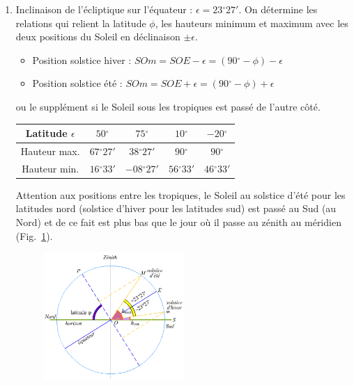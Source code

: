\documentclass[a4paper,10pt]{report}
\renewcommand{\deg}{\ensuremath{^{\circ}}}
\begin{document}
\begin{Answer}
  \begin{enumerate}
  \item Inclinaison de l'écliptique sur l'équateur :
    $\epsilon=23\deg27'$. On détermine les relations qui relient la
    latitude $\phi$, les hauteurs minimum et maximum avec les deux
    positions du Soleil en déclinaison $\pm \epsilon$.
    \begin{itemize}
    \item Position solstice hiver : $SOm = SOE - \epsilon =
      (90\deg-\phi) -\epsilon$
    \item Position solstice été : $SOm = SOE + \epsilon =
      (90\deg-\phi) +\epsilon$
    \end{itemize}
    ou le supplément si le Soleil sous les tropiques est passé de
    l'autre côté.
    \begin{center}
      \begin{tabular}{|c|c|c|c|c|}
        \hline
        Latitude $\epsilon$ & $50\deg$ & $75\deg$ & $10\deg$ &
        $-20\deg$ \\
        \hline
        Hauteur max. & $67\deg27'$ & $38\deg27'$ & $90\deg$ &
        $90\deg$ \\
        \hline
        Hauteur min. & $16\deg33'$ & $-08\deg27'$ & $56\deg33'$
        & $46\deg33'$ \\
        \hline
      \end{tabular}
    \end{center}
    Attention aux positions entre les tropiques, le Soleil au solstice
    d'été pour les latitudes nord (solstice d'hiver pour les latitudes
    sud) est passé au Sud (au Nord) et de ce fait est plus bas que le
    jour où il passe au zénith au méridien (Fig.~\ref{mvtsolaire}).

    \begin{figure}[htp]
      \centering
      \includegraphics[width=0.5\textwidth]{mvt_soleil}
      \label{mvtsolaire}
      \caption{}
    \end{figure}


\end{enumerate}
\end{Answer}
\end{document}
